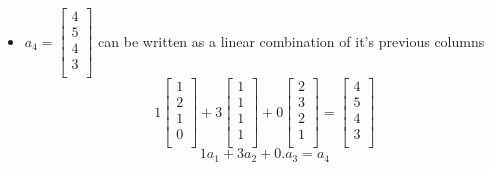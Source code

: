 \documentclass{article}
\begin{document}
\begin{itemize}
  \item $a_4=
          \begin{bmatrix}
            4 \\
            5 \\
            4 \\
            3 \\
          \end{bmatrix}
        $ can be written as a linear combination of it's previous columns
        $$
          1\begin{bmatrix}
            1 \\
            2 \\
            1 \\
            0 \\
          \end{bmatrix}+3\begin{bmatrix}
            1 \\
            1 \\
            1 \\
            1 \\
          \end{bmatrix}+0\begin{bmatrix}
            2 \\
            3 \\
            2 \\
            1 \\
          \end{bmatrix}=\begin{bmatrix}
            4 \\
            5 \\
            4 \\
            3 \\
          \end{bmatrix}
        $$
        $$
          1a_1+3a_2+0.a_3=a_4
        $$


\end{itemize}
\end{document}
